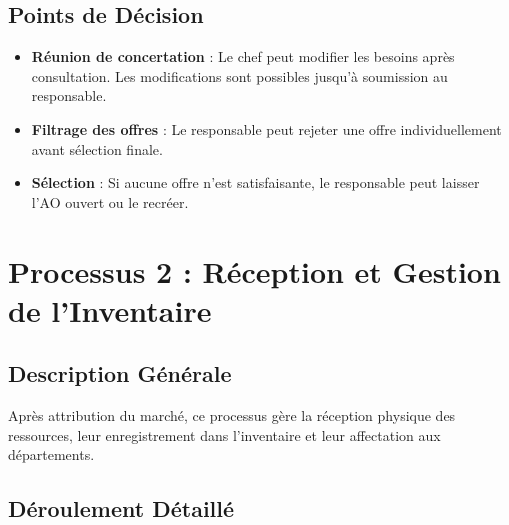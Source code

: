 \documentclass[12pt,a4paper]{report}
\begin{document}
\subsection{Points de Décision}

\begin{itemize}[leftmargin=1.5cm]
    \item \textbf{Réunion de concertation} : Le chef peut modifier les besoins après consultation. Les modifications sont possibles jusqu'à soumission au responsable.
    \item \textbf{Filtrage des offres} : Le responsable peut rejeter une offre individuellement avant sélection finale.
    \item \textbf{Sélection} : Si aucune offre n'est satisfaisante, le responsable peut laisser l'AO ouvert ou le recréer.
\end{itemize}

\section{Processus 2 : Réception et Gestion de l'Inventaire}

\subsection{Description Générale}

Après attribution du marché, ce processus gère la réception physique des ressources, leur enregistrement dans l'inventaire et leur affectation aux départements.

\subsection{Déroulement Détaillé}
\end{document}
